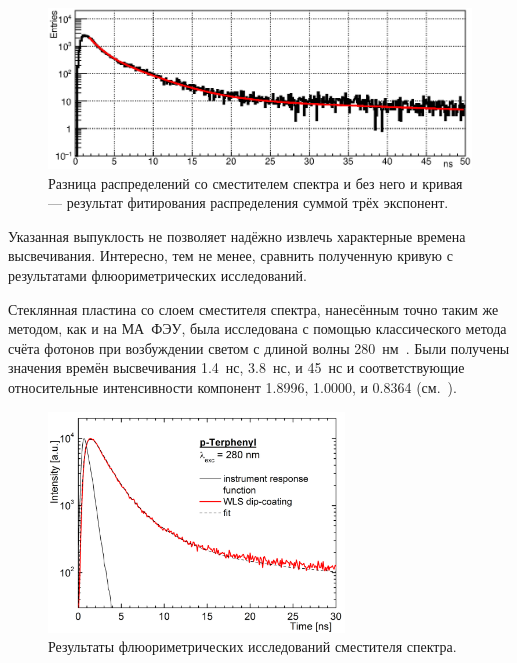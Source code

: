 \begin{figure}[H]
\centering
\includegraphics[width=1.0\textwidth]{pictures/27_WLSdiff_8feb.eps}
\caption{Разница распределений со сместителем спектра и без него и кривая --- результат фитирования распределения суммой трёх экспонент.}
\label{fig:WLSdiff}
\end{figure}

Указанная выпуклость не позволяет надёжно извлечь характерные времена высвечивания. Интересно, тем не менее, сравнить полученную кривую с результатами флюориметрических исследований.

Стеклянная пластина со слоем сместителя спектра, нанесённым точно таким же методом, как и на МА~ФЭУ, была исследована с помощью классического метода счёта фотонов при возбуждении светом с длиной волны 280~нм~\cite{DUERR}. Были получены значения времён высвечивания 1.4~нс, 3.8~нс, и 45~нс и соответствующие относительные интенсивности компонент 1.8996, 1.0000, и 0.8364 (см.~).

\begin{figure}[H]
\centering
\includegraphics[width=0.7\textwidth]{pictures/Tau_fluoro_WLS_JLU.png}
\caption{Результаты флюориметрических исследований сместителя спектра.} %
\label{fig:MichaelProfile}
\end{figure}

